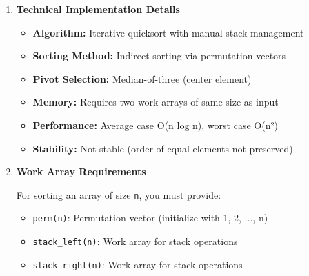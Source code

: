 \documentclass[11pt]{article}
\begin{document}
\begin{enumerate}
\begin{enumerate}
\begin{lstlisting}[language=Fortran]
! Access sorted data through permutation
! expression_data(perm(1)) is the smallest value
! expression_data(perm(1000)) is the largest value
	      	\end{lstlisting}
	      	
	      	\item \textbf{Technical Implementation Details}
	      	      
	      	      \begin{itemize}
	      	      	\item \textbf{Algorithm:} Iterative quicksort with manual stack
	      	      	      management
	      	      	      
	      	      	\item \textbf{Sorting Method:} Indirect sorting via permutation
	      	      	      vectors
	      	      	      
	      	      	\item \textbf{Pivot Selection:} Median-of-three (center element)
	      	      	      
	      	      	\item \textbf{Memory:} Requires two work arrays of same size as
	      	      	      input
	      	      	      
	      	      	\item \textbf{Performance:} Average case O(n log n), worst case O(n²)
	      	      	      
	      	      	\item \textbf{Stability:} Not stable (order of equal elements not preserved)
	      	      \end{itemize}
	      	      
	      	\item \textbf{Work Array Requirements}
	      	      
	      	      For sorting an array of size \texttt{n}, you must provide:
	      	      \begin{itemize}
	      	      	\item \texttt{perm(n)}: Permutation vector (initialize with 1, 2, ...,
	      	      	      n)
	      	      	      
	      	      	\item \texttt{stack\_left(n)}: Work array for stack operations
	      	      	      
	      	      	\item \texttt{stack\_right(n)}: Work array for stack operations
	      	      \end{itemize}
	      	      

\end{enumerate}
\end{enumerate}
\end{document}
